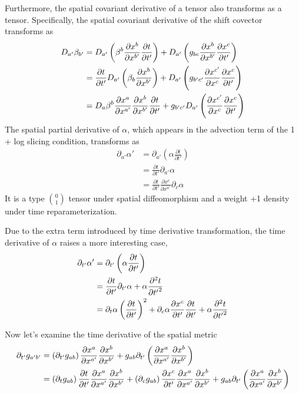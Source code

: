 \documentclass[letterpaper,nofootinbib,prd,amsmath,onecolumn]{revtex4-1}
\begin{document}
Furthermore, the spatial covariant derivative of a tensor also transforms as a tensor. Specifically, the spatial covariant derivative of the shift covector transforms as
\begin{align}
D_{a'}\beta_{b'} &= D_{a'}\left(\beta^{b}\frac{\partial x^{b}}{\partial x^{b'}}\frac{\partial t}{\partial t'}\right) + D_{a'}\left(g_{bc}\frac{\partial x^{b}}{\partial x^{b'}}\frac{\partial x^{c}}{\partial t'}\right)\notag\\
& = \frac{\partial t}{\partial t'}D_{a'}\left(\beta_{b}\frac{\partial x^{b}}{\partial x^{b'}}\right) + D_{a'}\left(g_{b'c'}\frac{\partial x^{c'}}{\partial x^{c}}\frac{\partial x^{c}}{\partial t'}\right)\notag\\
& = D_{a}\beta^{b}\frac{\partial x^{a}}{\partial x^{a'}}\frac{\partial x^{b}}{\partial x^{b'}}\frac{\partial t}{\partial t'} + g_{b'c'}D_{a'}\left(\frac{\partial x^{c'}}{\partial x^{c}}\frac{\partial x^{c}}{\partial t'}\right)
\end{align} 
The spatial partial derivative of $\alpha$, which appears in the advection term of the 1 + log slicing condition, transforms as 
\begin{align}
\partial_{a'}\alpha' & = \partial_{a'}\left(\alpha \frac{\partial t}{\partial t'}\right)\\
& = \frac{\partial t}{\partial t'}\partial_{a'}\alpha\\
& = \frac{\partial t}{\partial t'}\frac{\partial x^{c}}{\partial x^{a'}}\partial_{c}\alpha
\end{align}
It is a type $0 \choose 1$ tensor under spatial diffeomorphism and a weight +1 density under time reparameterization.

Due to the extra term introduced by time derivative transformation, the time derivative of $\alpha$ raises a more interesting case, 
\begin{align}
\partial_{t'}\alpha' & = \partial_{t'}\left(\alpha\frac{\partial t}{\partial t'}\right)\notag\\
& = \frac{\partial t}{\partial t'}\partial_{t'}\alpha + \alpha\frac{\partial^{2}t}{\partial {t'}^{2}}\notag\\
& = \partial_{t}\alpha\left(\frac{\partial t}{\partial t'}\right)^{2} + \partial_{c}\alpha\frac{\partial x^{c}}{\partial t'}\frac{\partial t}{\partial t'} + \alpha\frac{\partial^{2}t}{\partial {t'}^{2}}
\end{align}

Now let's examine the time derivative of the spatial metric
\begin{align}
\partial_{t'}g_{a'b'} & = \left(\partial_{t'}g_{ab}\right)\frac{\partial x^{a}}{\partial x^{a'}}\frac{\partial x^{b}}{\partial x^{b'}} + g_{ab}\partial_{t'}\left(\frac{\partial x^{a}}{\partial x^{a'}}\frac{\partial x^{b}}{\partial x^{b'}}\right)\notag\\
& =  \left(\partial_{t}g_{ab}\right)\frac{\partial t}{\partial t'}\frac{\partial x^{a}}{\partial x^{a'}}\frac{\partial x^{b}}{\partial x^{b'}} + \left(\partial_{c}g_{ab}\right)\frac{\partial x^{c}}{\partial t'}\frac{\partial x^{a}}{\partial x^{a'}}\frac{\partial x^{b}}{\partial x^{b'}} + g_{ab}\partial_{t'}\left(\frac{\partial x^{a}}{\partial x^{a'}}\frac{\partial x^{b}}{\partial x^{b'}}\right)
\end{align}
\end{document}
